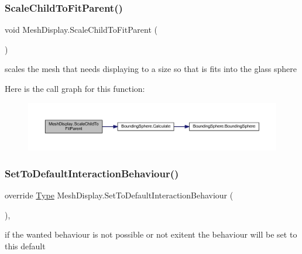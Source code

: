 \subsubsection{\texorpdfstring{Scale\+Child\+To\+Fit\+Parent()}{ScaleChildToFitParent()}}
{\footnotesize\ttfamily void Mesh\+Display.\+Scale\+Child\+To\+Fit\+Parent (\begin{DoxyParamCaption}{ }\end{DoxyParamCaption})}



scales the mesh that needs displaying to a size so that is fits into the glass sphere 

Here is the call graph for this function\+:
\nopagebreak
\begin{figure}[H]
\begin{center}
\leavevmode
\includegraphics[width=350pt]{class_mesh_display_a94176ce6e76cc683336051b49573ab1f_cgraph}
\end{center}
\end{figure}
\mbox{\label{class_mesh_display_a8cd58e07cb9d64598c3bbc6701515d1d}} 
\subsubsection{\texorpdfstring{Set\+To\+Default\+Interaction\+Behaviour()}{SetToDefaultInteractionBehaviour()}}
{\footnotesize\ttfamily override \mbox{\hyperlink{class_display_a2c80ba13fff1fd81aaa6915b28e8c14f}{Type}} Mesh\+Display.\+Set\+To\+Default\+Interaction\+Behaviour (\begin{DoxyParamCaption}{ }\end{DoxyParamCaption})\hspace{0.3cm}{\ttfamily [protected]}, {\ttfamily [virtual]}}



if the wanted behaviour is not possible or not exitent the behaviour will be set to this default 



